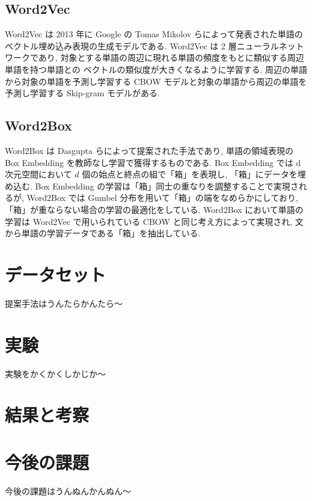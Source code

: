 \documentclass[twocolumn]{jarticle}     %
\begin{document}
\subsection{Word2Vec}
Word2Vec は 2013 年に Google の Tomas Mikolov らによって発表された単語のベクトル埋め込み表現の生成モデルである. 
Word2Vec は 2 層ニューラルネットワークであり, 対象とする単語の周辺に現れる単語の頻度をもとに類似する周辺単語を持つ単語との
ベクトルの類似度が大きくなるように学習する. 周辺の単語から対象の単語を予測し学習する CBOW モデルと対象の単語から周辺の単語を予測し学習する Skip-gram モデルがある.

\subsection{Word2Box}
Word2Box は Dasgupta らによって提案された手法であり, 単語の領域表現の Box Embedding を教師なし学習で獲得するものである. 
Box Embedding では d 次元空間において $d$ 個の始点と終点の組で「箱」を表現し, 「箱」にデータを埋め込む.
Box Embedding の学習は「箱」同士の重なりを調整することで実現されるが, Word2Box では Gumbel 分布を用いて「箱」の端をなめらかにしており, 
「箱」が重ならない場合の学習の最適化をしている. 
Word2Box において単語の学習は Word2Vec で用いられている CBOW と同じ考え方によって実現され, 文から単語の学習データである「箱」を抽出している.

\section{データセット}
提案手法はうんたらかんたら〜

\section{実験}
実験をかくかくしかじか〜

\section{結果と考察}

\section{今後の課題}
今後の課題はうんぬんかんぬん〜


\end{document}
